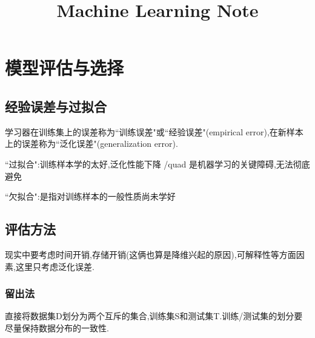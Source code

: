 \documentclass[12pt]{article}
\numberwithin{equation}{section}%
\begin{document}
\title{\vspace{-2em}Machine Learning Note\vspace{-0.7em}}
\author{}
\date{}
\maketitle\thispagestyle{fancy}
\maketitle
\tableofcontents 

\linespread{1.5} %


\section{模型评估与选择}

\subsection{经验误差与过拟合}

学习器在训练集上的误差称为``训练误差"或``经验误差"(empirical error),在新样本上的误差称为``泛化误差"(generalization error).

``过拟合":训练样本学的太好,泛化性能下降      /quad 是机器学习的关键障碍,无法彻底避免

``欠拟合":是指对训练样本的一般性质尚未学好

\subsection{评估方法}

现实中要考虑时间开销,存储开销(这俩也算是降维兴起的原因),可解释性等方面因素,这里只考虑泛化误差.

\subsubsection{留出法}

直接将数据集D划分为两个互斥的集合,训练集S和测试集T.训练/测试集的划分要尽量保持数据分布的一致性.
\end{document}
